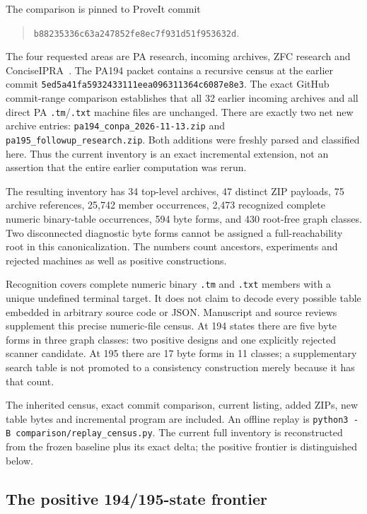 \documentclass[11pt,letterpaper]{article}
\newcommand{\file}[1]{\texttt{\nolinkurl{#1}}}
\begin{document}
The comparison is pinned to ProveIt commit
\begin{quote}\small\nolinkurl{b88235336c63a247852fe8ec7f931d51f953632d}.\end{quote}
The four requested areas are PA research, incoming archives, ZFC research and
ConciseIPRA~\cite{repo,incoming,zfc,ipra}. The PA194 packet contains a recursive
census at the earlier commit
\file{5ed5a41fa5932433111eea096311364c6087e8e3}. The exact GitHub commit-range
comparison establishes that all 32 earlier incoming archives and all direct
PA \file{.tm}/\file{.txt} machine files are unchanged. There are exactly two
net new archive entries: \file{pa194_conpa_2026-11-13.zip} and
\file{pa195_followup_research.zip}. Both additions were freshly parsed and
classified here. Thus the current inventory is an exact incremental extension,
not an assertion that the entire earlier computation was rerun.

The resulting inventory has 34 top-level archives, 47 distinct ZIP payloads,
75 archive references, 25,742 member occurrences, 2,473 recognized complete
numeric binary-table occurrences, 594 byte forms, and 430 root-free graph
classes. Two disconnected diagnostic byte forms cannot be assigned a
full-reachability root in this canonicalization. The numbers count ancestors,
experiments and rejected machines as well as positive constructions.

Recognition covers complete numeric binary \file{.tm} and \file{.txt}
members with a unique undefined terminal target. It does not claim to decode
every possible table embedded in arbitrary source code or JSON. Manuscript
and source reviews supplement this precise numeric-file census. At 194 states
there are five byte forms in three graph classes: two positive designs and
one explicitly rejected scanner candidate. At 195 there are 17 byte forms
in 11 classes; a supplementary search table is not promoted to a consistency
construction merely because it has that count.

The inherited census, exact commit comparison, current listing, added ZIPs,
new table bytes and incremental program are included. An offline replay is
\texttt{python3 -B comparison/replay\_census.py}. The current full inventory is
reconstructed from the frozen baseline plus its exact delta; the positive
frontier is distinguished below.

\subsection{The positive 194/195-state frontier}
\end{document}
